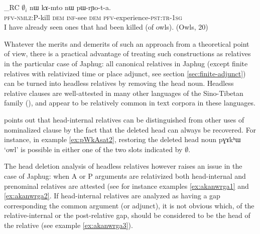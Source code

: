 \documentclass[oldfontcommands,oneside,a4paper,11pt]{article}
\newcommand{\ipa}[1]{{\phon #1}} %
\newcommand{\topic}{\textsc{dem}}
\begin{document}
   \begin{exe}
\ex \label{ex:pWkAsat2}
\gll [$\emptyset_i$ \ipa{pɯ-kɤ-sat}]_{RC}  $\emptyset_i$ 	\ipa{nɯ}  	\ipa{kɤ-mto}  	\ipa{nɯ}  	\ipa{pɯ-rɲo-t-a.}  \\
{ }  \textsc{pfv-nmlz:P}-kill { } \topic{} \textsc{inf}-see \topic{} \textsc{pfv}-experience-\textsc{pst:tr-1sg} \\
\glt I have already seen ones that had been killed (of owls). (Owls, 20)
  \end{exe}

Whatever the merits and demerits of such an approach from a theoretical point of view, there is a practical advantage of treating such constructions as relatives in the particular case of Japhug: all canonical relatives in Japhug (except  finite relatives with relativized time or place adjunct, see section \ref{sec:finite-adjunct}) can be turned into headless relatives by removing the head noun. Headless relative clauses are well-attested in many other languages of the Sino-Tibetan family (\citealt[128-9]{genetti08nmlz}), and appear to be relatively common in text corpora in these languages.

\citet[227]{coupe07mongsen} points out that head-internal relatives can be distinguished from other uses of nominalized clause by the fact that the deleted head can always be recovered. For instance, in example \ref{ex:pWkAsat2}, restoring the deleted head noun \ipa{pɣɤkʰɯ} `owl' is possible in either one of the two slots indicated by $\emptyset$.

The head deletion analysis of headless relatives however raises an issue in the case of Japhug:  when A or P arguments are relativized both head-internal and prenominal relatives are attested (see for instance examples \ref{ex:akanwrga1} and \ref{ex:akanwrga2}. If head-internal relatives are analyzed as having a gap corresponding the common argument (or adjunct), it is not obvious which, of the relative-internal or the post-relative gap, should be considered to be the head of the relative (see example \ref{ex:akanwrga3}).
\end{document}
